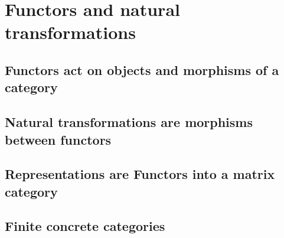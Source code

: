 
\section{Functors and natural transformations}

\subsection{Functors act on objects and morphisms of a category}

\subsection{Natural transformations are morphisms between functors}

\subsection{Representations are Functors into a matrix category}

\subsection{Finite concrete categories}